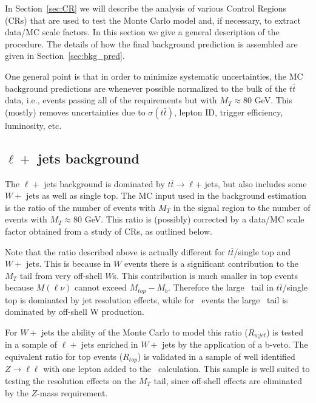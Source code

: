 In Section~\ref{sec:CR} we will describe the analysis of various Control Regions
(CRs)  that are used to test the Monte Carlo model and, if necessary,
to extract data/MC scale factors.  In this section we give a
general description of the procedure.  The details of how the
final background prediction is assembled are given in Section~\ref{sec:bkg_pred}.




One general point is that in order to minimize systematic uncertainties, the MC background
predictions are whenever possible normalized to the bulk of the $t\bar{t}$ data, i.e., events passing all of the 
requirements but with $M_T \approx 80$ GeV.
This (mostly) removes uncertainties
due to $\sigma(t\bar{t})$, lepton ID, trigger efficiency, luminosity, etc.   

\subsection{$\ell +$ jets background}
\label{sec:ljbg-general}

The $\ell +$ jets background is dominated by 
$t\bar{t} \to \ell $+ jets, but also includes some $W +$ jets as well as single top.
The MC input used in the background estimation
is the ratio of the number of events with $M_T$ in the signal region
to the number of events with $M_T \approx 80$ GeV.
This ratio is (possibly) corrected by a data/MC scale factor obtained
from a study of CRs, as outlined below.

Note that the ratio described above is actually different for 
$t\bar{t}$/single top and $W +$ jets.  This is because in $W$ events
there is a significant contribution to the $M_T$ tail from very off-shell
$W$s.
This contribution is much smaller in top events because $M(\ell \nu)$
cannot exceed $M_{top}-M_b$. Therefore the large \mt\ tail in 
$t\bar{t}$/single top is dominated by jet resolution effects,
while for \wjets\ events the large \mt\ tail is dominated by off-shell W production.



For $W +$ jets the ability of the Monte Carlo to model this ratio
($R_{wjet}$) is tested in a sample of $\ell +$ jets enriched in 
$W +$ jets by the application of a b-veto.
The equivalent ratio for top events ($R_{top}$) is validated in a sample of well
identified $Z \to \ell \ell$ with one lepton added to the \met\
calculation.
This sample is well suited to testing the resolution effects on 
the $M_T$ tail, since off-shell effects are eliminated by the $Z$-mass
requirement.

